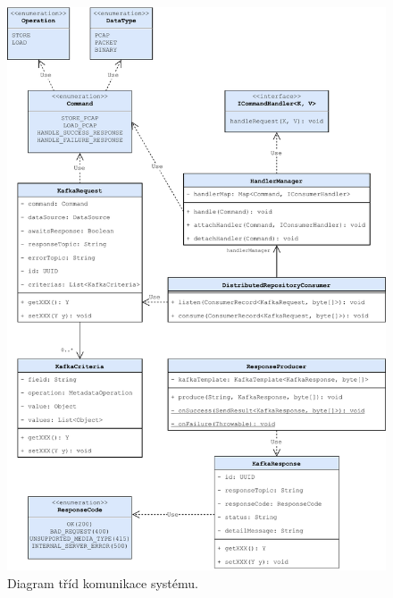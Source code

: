 \begin{figure}[!h]
  \centering
  \includegraphics[width=15cm]{template-fig/CommunicationClassDiagram.pdf}
  \caption{Diagram tříd komunikace systému.}
  \label{FIG_CommunicationClassDiagram}
\end{figure}

